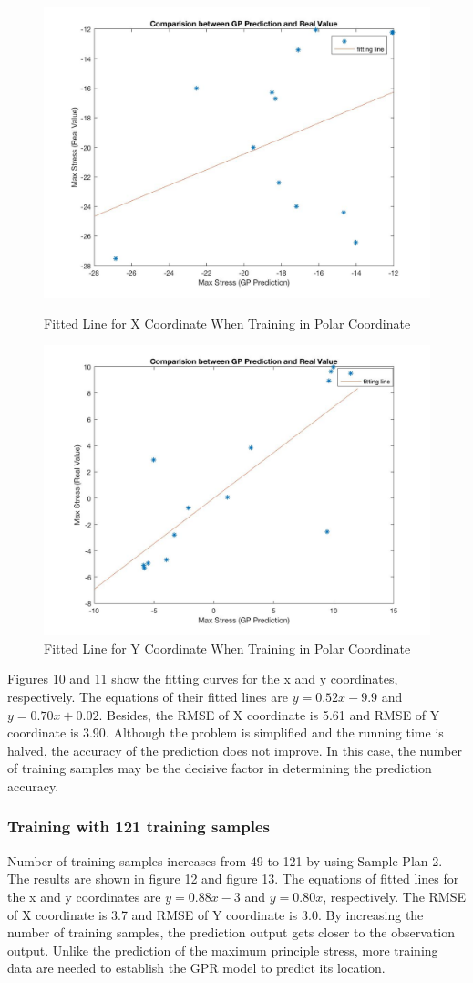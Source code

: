 \documentclass[conference]{IEEEtran}
\begin{document}
\begin{figure} 
\centering
\includegraphics[width=3.4 in,height=2.5 in]{49_x.jpg}
\caption{Fitted Line for X Coordinate When Training in Polar Coordinate}
\includegraphics[width=3.4 in,height=2.5 in]{49_y.jpg}
\caption{Fitted Line for Y Coordinate When Training in Polar Coordinate}
\label{fig:graph}
\end{figure}

Figures 10 and 11 show the fitting curves for the x and y coordinates, respectively. The equations of their fitted lines are $y = 0.52 x -9.9$ and $y = 0.70x + 0.02$. Besides, the RMSE of X coordinate is 5.61 and RMSE of Y coordinate is 3.90. Although the problem is simplified and the running time is halved, the accuracy of the prediction does not improve. In this case, the number of training samples may be the decisive factor in determining the prediction accuracy.

\subsubsection{Training with 121 training samples }

Number of training samples increases from 49 to 121 by using Sample Plan 2. The results are shown in figure 12 and figure 13. The equations of fitted lines for the x and y coordinates are $y =0.88 x -3$ and $y = 0.80x $, respectively.  The RMSE of X coordinate is 3.7 and RMSE of Y coordinate is 3.0. By increasing the number of training samples, the prediction output gets closer to the observation output. Unlike the prediction of the maximum principle stress, more training data are needed to establish the GPR model to predict its location.
\end{document}
